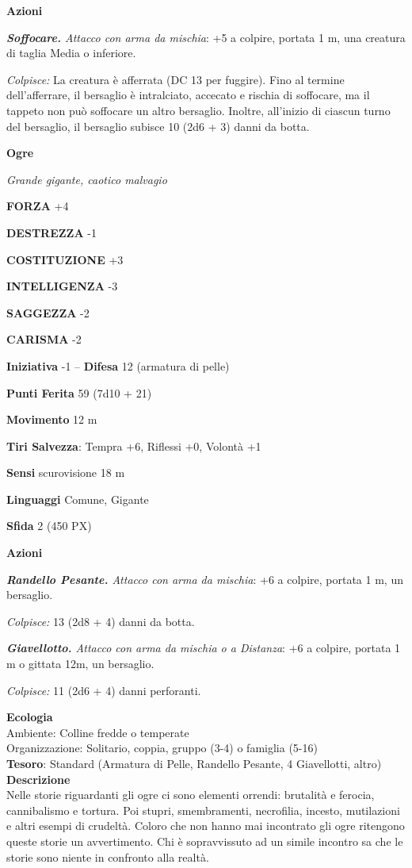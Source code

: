 \begin{multicols}{2}
\textbf{Azioni}

\textit{\textbf{Soffocare.} Attacco con arma da mischia}: +5 a colpire, portata 1 m, una creatura di taglia Media o inferiore.

\textit{Colpisce:} La creatura è afferrata (DC 13 per fuggire). Fino al termine dell'afferrare, il bersaglio è intralciato, accecato e rischia di soffocare, ma il tappeto non può soffocare un altro bersaglio. Inoltre, all'inizio di ciascun turno del bersaglio, il bersaglio subisce 10 (2d6 + 3) danni da botta.

\medskip{}\textbf{Ogre}

\textit{Grande gigante, caotico malvagio}

\textbf{FORZA} +4

\textbf{DESTREZZA} -1

\textbf{COSTITUZIONE} +3

\textbf{INTELLIGENZA} -3

\textbf{SAGGEZZA} -2

\textbf{CARISMA} -2

\textbf{Iniziativa} -1 -- \textbf{Difesa} 12 (armatura di pelle)

\textbf{Punti Ferita} 59 (7d10 + 21)

\textbf{Movimento} 12 m

\textbf{Tiri Salvezza}: Tempra +6, Riflessi +0, Volontà +1

\textbf{Sensi} scurovisione 18 m

\textbf{Linguaggi} Comune, Gigante

\textbf{Sfida} 2 (450 PX)

\textbf{Azioni}

\textit{\textbf{Randello Pesante.} Attacco con arma da mischia}: +6 a colpire, portata 1 m, un bersaglio.

\textit{Colpisce:} 13 (2d8 + 4) danni da botta.

\textit{\textbf{Giavellotto.} Attacco con arma da mischia o a Distanza}: +6 a colpire, portata 1 m o gittata 12m, un bersaglio.

\textit{Colpisce:} 11 (2d6 + 4) danni perforanti.

\textbf{Ecologia}\\
Ambiente: Colline fredde o temperate\\
Organizzazione: Solitario, coppia, gruppo (3-4) o famiglia (5-16)\\
\textbf{Tesoro}: Standard (Armatura di Pelle, Randello Pesante, 4 Giavellotti, altro)\\
\textbf{Descrizione}\\
Nelle storie riguardanti gli ogre ci sono elementi orrendi: brutalità e ferocia, cannibalismo e tortura. Poi stupri, smembramenti, necrofilia, incesto, mutilazioni e altri esempi di crudeltà. Coloro che non hanno mai incontrato gli ogre ritengono queste storie un avvertimento. Chi è sopravvissuto ad un simile incontro sa che le storie sono niente in confronto alla realtà.


\end{multicols}
